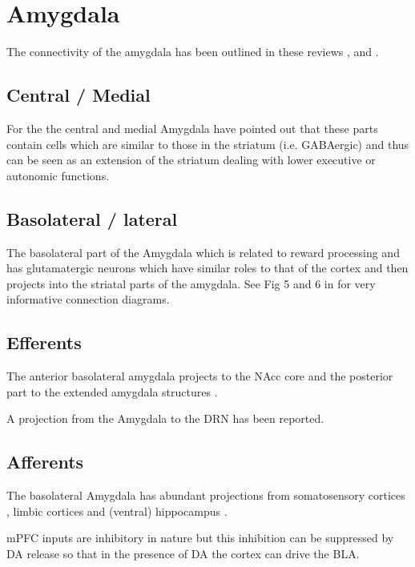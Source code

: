 \documentclass[12pt,a4paper]{article}
\let\oldsection\section
\renewcommand\section{\clearpage\oldsection}
\begin{document}
\section{Amygdala}

The connectivity of the amygdala has been outlined in these reviews \citep{Alheid2003}, \citep{Sah2003} and \citep{Swanson1998}.

\subsection{Central / Medial}

For the  the central and medial Amygdala \citep{Swanson2003}\citep{Swanson1998} have pointed out that these parts contain cells which are similar to those in the striatum (i.e. GABAergic) and thus can be seen as an extension of the striatum dealing with lower executive or autonomic functions.

\subsection{Basolateral / lateral}

The basolateral part of the Amygdala which is related to reward processing and has glutamatergic neurons which have similar roles to that of the cortex and then projects into the striatal parts of the amygdala. See Fig 5 and 6 in \citep{Swanson1998} for very informative connection diagrams.

\subsection{Efferents}

The anterior basolateral amygdala projects to the NAcc core and the  posterior part to the extended amygdala structures  \citep{Alheid2003}.

A projection from the Amygdala to the DRN \citep{PollakDorocic2014} has been reported.

\subsection{Afferents}

The basolateral Amygdala has abundant projections from somatosensory cortices 
\citep{Swanson1998}, limbic cortices \citep{Ottersen1982} and (ventral) hippocampus \citep{Pitkanen2000}.

mPFC inputs are inhibitory in nature \citep{Rosenkranz2002} but this inhibition can be suppressed by DA release so that in the presence of DA the cortex can drive the BLA.
\end{document}
